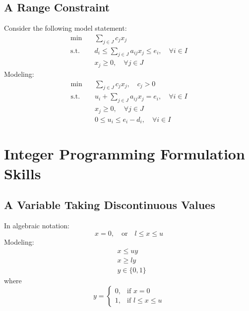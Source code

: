				\subsection{A Range Constraint}
					Consider the following model statement:
					\begin{align}
						\min \quad & \sum_{j\in J}c_jx_j \\
						\text{s.t.} \quad & d_i\le \sum_{j\in J}a_{ij}x_j \le e_i, \quad \forall i\in I \\
						                  & x_j \ge 0, \quad \forall j\in J 
					\end{align}
					Modeling:
					\begin{align}
						\min \quad & \sum_{j\in J}c_jx_j, \quad c_j > 0 \\
						\text{s.t.} \quad & u_i + \sum_{j\in J}a_{ij}x_j = e_i, \quad \forall i\in I \\
						                  & x_j \ge 0, \quad \forall j\in J \\
						                  & 0\le u_i \le e_i-d_i, \quad \forall i\in I 
					\end{align}

			\section{Integer Programming Formulation Skills}
				\subsection{A Variable Taking Discontinuous Values}
					In algebraic notation: 
					\begin{equation}
						x = 0,\quad \text{or} \quad l\le x \le u 
					\end{equation}
					Modeling:
					\begin{align}
						& x \le uy \\
						& x \ge ly  \\
						& y \in \{0, 1\} 
					\end{align}
					where
					\begin{equation}y=\begin{cases}0, & \text{if }x=0 \\ 1, & \text{if } l\le x \le u\end{cases} \end{equation}

